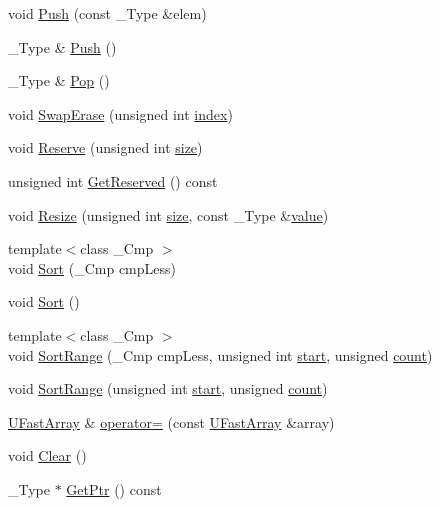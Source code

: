 \begin{CompactItemize}
void \hyperlink{class_u_fast_array_23fd2ded4aa241f76b313a925861c828}{Push} (const \_\-Type \&elem)
\item 
\_\-Type \& \hyperlink{class_u_fast_array_b2c21774ba42f9480a447095d4dde0ed}{Push} ()
\item 
\_\-Type \& \hyperlink{class_u_fast_array_fc4eda064bb9ee287f6217cb81a4fef8}{Pop} ()
\item 
void \hyperlink{class_u_fast_array_2f2a33eef1bbf4679b8a4231bf4228aa}{SwapErase} (unsigned int \hyperlink{glext__bak_8h_57f14e05b1900f16a2da82ade47d0c6d}{index})
\item 
void \hyperlink{class_u_fast_array_aab86583bca71336ee7122bc77aa861e}{Reserve} (unsigned int \hyperlink{glext__bak_8h_3d1e3edfcf61ca2d831883e1afbad89e}{size})
\item 
unsigned int \hyperlink{class_u_fast_array_19b5d66abeea2c7288423ff604348e57}{GetReserved} () const 
\item 
void \hyperlink{class_u_fast_array_406813631148524e47f65bb3be44db61}{Resize} (unsigned int \hyperlink{glext__bak_8h_3d1e3edfcf61ca2d831883e1afbad89e}{size}, const \_\-Type \&\hyperlink{glext__bak_8h_6a4f8a1a444e9080b297963b3db29fe0}{value})
\item 
{\footnotesize template$<$class \_\-Cmp $>$ }\\void \hyperlink{class_u_fast_array_3dff70d6c3f2ed43048a54311c842379}{Sort} (\_\-Cmp cmpLess)
\item 
void \hyperlink{class_u_fast_array_0014e3fe79bdb6c69e4e37028a38d5ff}{Sort} ()
\item 
{\footnotesize template$<$class \_\-Cmp $>$ }\\void \hyperlink{class_u_fast_array_31a5d8dde4048ed86ab37bab67ddc4e9}{SortRange} (\_\-Cmp cmpLess, unsigned int \hyperlink{glext__bak_8h_c55adc720a3098c1b454d2a4647f4361}{start}, unsigned \hyperlink{wglext_8h_98d18d6b4e3ba4ed266c6fb54c839d70}{count})
\item 
void \hyperlink{class_u_fast_array_49348ec3f8dc21f778392013f4b9c966}{SortRange} (unsigned int \hyperlink{glext__bak_8h_c55adc720a3098c1b454d2a4647f4361}{start}, unsigned \hyperlink{wglext_8h_98d18d6b4e3ba4ed266c6fb54c839d70}{count})
\item 
\hyperlink{class_u_fast_array}{UFastArray} \& \hyperlink{class_u_fast_array_91c515426b0745d5ed8b453aa410a738}{operator=} (const \hyperlink{class_u_fast_array}{UFastArray} \&array)
\item 
void \hyperlink{class_u_fast_array_97c6c9910cc6e541254eaaaa530d48a9}{Clear} ()
\item 
\_\-Type $\ast$ \hyperlink{class_u_fast_array_8db9c643b2bd8c7a2a4770e74ca76e31}{GetPtr} () const 
\end{CompactItemize}


